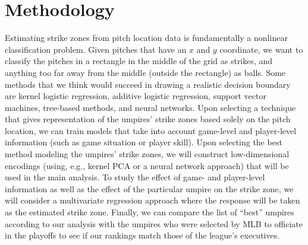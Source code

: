 \documentclass[bj, preprint]{imsart}
\begin{document}
\section{Methodology}\label{sec:method}
Estimating strike zones from pitch location data is fundamentally a nonlinear classification problem. 
Given pitches that have an $x$ and $y$ coordinate, we want to classify the pitches in a rectangle in the middle of the grid as strikes, and anything too far away from the middle (outside the rectangle) as balls.
Some methods that we think would succeed in drawing a realistic decision boundary are kernel logistic regression, additive logistic regression, support vector machines, tree-based methods, and neural networks. 
Upon selecting a technique that gives representation of the umpires' strike zones based solely on the pitch location, we can train models that take into account game-level and player-level information (such as game situation or player skill).
Upon selecting the best method modeling the umpires' strike zones, we will construct low-dimensional encodings (using, e.g., kernel PCA or a neural network approach) that will be used in the main analysis.
To study the effect of game- and player-level information as well as the effect of the particular umpire on the strike zone, we will consider a multivariate regression approach where the response will be taken as the estimated strike zone.
Finally, we can compare the list of ``best'' umpires according to our analysis with the umpires who were selected by MLB to officiate in the playoffs to see if our rankings match those of the league's executives.


{}
\end{document}
